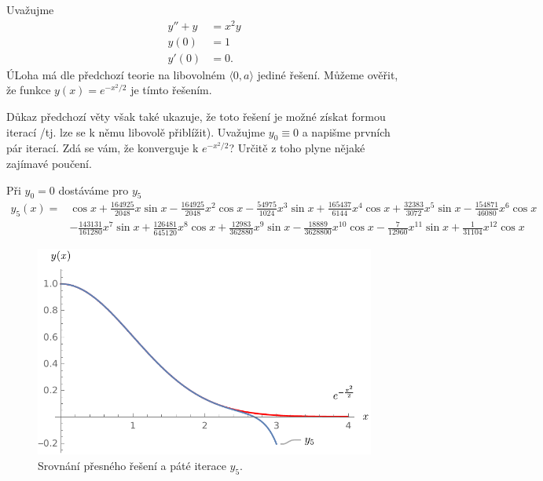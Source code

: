\Priklad

Uvažujme
\begin{equation*}
    \begin{split}
        y''+y&=x^2y\\
        y(0)&=1\\
        y'(0)&=0.
    \end{split}
\end{equation*}
ÚLoha má dle předchozí teorie na libovolném $\langle 0,a\rangle$ jediné řešení. Můžeme ověřit, že funkce $y(x)=e^{-x^2/2}$ je tímto řešením.

Důkaz předchozí věty však také ukazuje, že toto řešení je možné získat formou iterací /tj. lze se k němu libovolě přiblížit). Uvažujme $y_0\equiv 0$ a napišme prvních pár iterací. Zdá se vám, že konverguje k $e^{-x^2/2}$? Určitě z toho plyne nějaké zajímavé poučení.\smiley{}

Při $y_0=0$ dostáváme pro $y_5$
\begin{equation*}
    \begin{split}
        y_5(x) =&\cos  x  +\frac{164925}{2048} x \sin  x   - \frac{164925}{2048} x^2 \cos  x   -\frac{54975}{1024} x^3 \sin  x   +\frac{165437}{6144} x^4 \cos  x   +\frac{32383}{3072}  x^5 \sin  x-\frac{154871}{46080}  x^6 \cos  x   \\  &-\frac{143131 }{161280}x^7 \sin  x    +\frac{126481 }{645120}x^8 \cos  x    +\frac{12983}{362880}  x^9 \sin  x -\frac{18889 }{3628800}x^{10} \cos  x-\frac{7}{12960} x^{11} \sin  x+\frac{1}{31104}x^{12} \cos  x
    \end{split}
\end{equation*}
\begin{figure}[h!]
    \centering
    \includegraphics{img/exp_reseni.pdf}
    \caption{Srovnání přesného řešení a páté iterace $y_5$.}
\end{figure}





